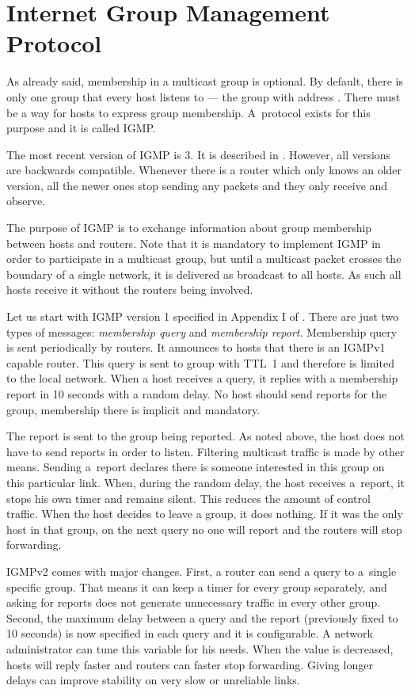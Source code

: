 \section{Internet Group Management Protocol}

As already said, membership in a multicast group is optional. By default, there
is only one group that every host listens to --- the  group with address
. There must be a way for hosts to express group membership.
A~protocol exists for this purpose and it is called IGMP.

The most recent version of IGMP is 3. It is described in . However, all
versions are backwards compatible. Whenever there is a router which only knows
an older version, all the newer ones stop sending any packets and they only receive and observe.

The purpose of IGMP is to exchange information about group membership between
hosts and routers. Note that it is mandatory to implement IGMP in order to participate in
a multicast group, but until a multicast packet crosses the boundary of a single network, it
is delivered as broadcast to all hosts. As such all hosts receive it without
the routers being involved.

Let us start with IGMP version 1 specified in Appendix I of . There
are just two types of messages: \emph{membership query} and \emph{membership report}.
Membership query is sent periodically by routers. It announces to hosts that there
is an IGMPv1 capable router. This query is sent to  group with TTL~1 and
therefore is limited to the local network. When a host receives a query, it replies with
a membership report in 10 seconds with a random delay. No host should send
reports for the  group, membership there is implicit and mandatory.

The report is sent to the group being reported. As noted above, the host does not have
to send reports in order to listen. Filtering multicast traffic is made by other means.
Sending a~report declares there is someone interested in this group on this
particular link. When, during the random delay, the host receives a~report, it
stops his own timer and remains silent. This reduces the amount of control
traffic. When the host decides to leave a group, it does nothing. If it was the
only host in that group, on the next query no one will report and the routers will
stop forwarding.

IGMPv2 \cite{rfc2236} comes with major changes. First, a router can send
a query to a~single specific group. That means it can keep a timer for every group
separately, and asking for reports does not generate unnecessary traffic in
every other group. Second, the maximum delay between a query and the report
(previously fixed to 10 seconds) is now specified in each query and it is
configurable. A network administrator can tune this variable for his needs.
When the value is decreased, hosts will reply faster and routers can faster stop
forwarding. Giving longer delays can improve stability on very slow or
unreliable links.

